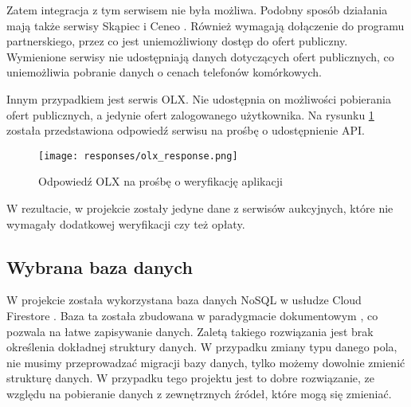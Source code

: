 Zatem integracja z tym serwisem nie była możliwa. Podobny sposób działania mają także serwisy Skąpiec \cite{skapiec} i Ceneo \cite{ceneo}. Również wymagają dołączenie do programu partnerskiego, przez co jest uniemożliwiony dostęp do ofert publiczny. Wymienione serwisy nie udostępniają danych dotyczących ofert publicznych, co uniemożliwia pobranie danych o cenach telefonów komórkowych.

Innym przypadkiem jest serwis OLX. Nie udostępnia on możliwości pobierania ofert publicznych, a jedynie ofert zalogowanego użytkownika. Na rysunku \ref*{olx_response} została przedstawiona odpowiedź serwisu na prośbę o udostępnienie API.

\begin{figure}[H]
    \centering
    \texttt{[image: responses/olx\_response.png]}
    \caption{Odpowiedź OLX na prośbę o weryfikację aplikacji}
    \label{olx_response}
\end{figure}

W rezultacie, w projekcie zostały jedyne dane z serwisów aukcyjnych, które nie wymagały dodatkowej weryfikacji czy też opłaty.

\subsection{Wybrana baza danych}
W projekcie została wykorzystana baza danych NoSQL \cite{NoSQL} w usłudze Cloud Firestore \cite{firestore}. Baza ta została zbudowana w paradygmacie dokumentowym \cite{document_based_database}, co pozwala na łatwe zapisywanie danych. Zaletą takiego rozwiązania jest brak określenia dokładnej struktury danych. W przypadku zmiany typu danego pola, nie musimy przeprowadzać migracji bazy danych, tylko możemy dowolnie zmienić strukturę danych. W przypadku tego projektu jest to dobre rozwiązanie, ze względu na pobieranie danych z zewnętrznych źródeł, które mogą się zmieniać.

